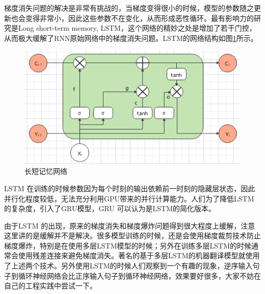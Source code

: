 \documentclass[twoside,a4paper,12pt]{book}%
\begin{document}
 梯度消失问题的解决是非常有挑战的，当梯度变得很小的时候，模型的参数随之更新也会变得非常小，因此这些参数不在变化，从而形成恶性循环。最有影响力的研究是Long short-term memory, \gls{LSTM}，这个网络的精妙之处是增加了若干门控，从而极大缓解了\gls{RNN}原始网络中的梯度消失问题。\gls{LSTM}的网络结构如图\ref{fig:lstm1}所示。
\begin{figure}[htbp]
\begin{center}
\includegraphics[width=4.5in]{figures/lstm1.png}
\caption{长短记忆网络}\label{fig:lstm1}
\end{center}
\end{figure}  
\gls{LSTM} 在训练的时候参数因为每个时刻的输出依赖前一时刻的隐藏层状态，因此并行化程度较低，无法充分利用GPU带来的并行计算能力。人们为了降低\gls{LSTM} 的复杂度，引入了\gls{GRU}模型，\gls{GRU} 可以认为是\gls{LSTM}的简化版本。

由于\gls{LSTM} 的出现，原来的梯度消失和梯度爆炸问题得到很大程度上缓解，注意这里讲的是缓解并不是解决。很多模型训练的时候，还是会使用梯度裁剪技术防止梯度爆炸，特别是在使用多层\gls{LSTM}模型的时候；另外在训练多层\gls{LSTM}的时候通常会使用残差连接来避免梯度消失。著名的基于多层\gls{LSTM}的机器翻译模型就使用了上述两个技术。另外使用\gls{LSTM}的时候人们观察到一个有趣的现象，逆序输入句子到循环神经网络会比正序输入句子到循环神经网络，效果要好很多，大家不妨在自己的工程实践中尝试一下。
\end{document}
